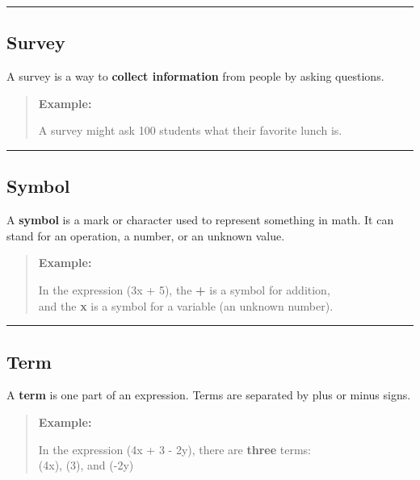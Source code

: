 \documentclass[
  letterpaper,
  DIV=11,
  numbers=noendperiod]{scrreprt}
\begin{document}
\begin{center}\rule{0.5\linewidth}{0.5pt}\end{center}

\subsection*{Survey}\label{glossary-survey}

A survey is a way to \textbf{collect information} from people by asking
questions.

\begin{quote}
\textbf{Example:}

A survey might ask 100 students what their favorite lunch is.
\end{quote}

\begin{center}\rule{0.5\linewidth}{0.5pt}\end{center}

\subsection*{Symbol}\label{glossary-symbol}

A \textbf{symbol} is a mark or character used to represent something in
math. It can stand for an operation, a number, or an unknown value.

\begin{quote}
\textbf{Example:}

In the expression (3x + 5), the \textbf{+} is a symbol for addition,\\
and the \textbf{x} is a symbol for a variable (an unknown number).
\end{quote}

\begin{center}\rule{0.5\linewidth}{0.5pt}\end{center}

\subsection*{Term}\label{glossary-term}

A \textbf{term} is one part of an expression. Terms are separated by
plus or minus signs.

\begin{quote}
\textbf{Example:}

In the expression (4x + 3 - 2y), there are \textbf{three} terms:\\
(4x), (3), and (-2y)
\end{quote}
\end{document}
